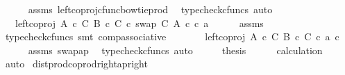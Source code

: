 \begin{isabellebody}
\ \ \ \ \isamarkupfalse%
\ assms\ left{\isacharunderscore}{\kern0pt}coproj{\isacharunderscore}{\kern0pt}cfunc{\isacharunderscore}{\kern0pt}bowtie{\isacharunderscore}{\kern0pt}prod\ \isamarkupfalse%
\ {\isacharparenleft}{\kern0pt}typecheck{\isacharunderscore}{\kern0pt}cfuncs{\isacharcomma}{\kern0pt}\ auto{\isacharparenright}{\kern0pt}\isanewline
\ \ \isamarkupfalse%
\ \isamarkupfalse%
\ {\isachardoublequoteopen}{\isachardot}{\kern0pt}{\isachardot}{\kern0pt}{\isachardot}{\kern0pt}\ {\isacharequal}{\kern0pt}\ left{\isacharunderscore}{\kern0pt}coproj\ {\isacharparenleft}{\kern0pt}A\ {\isasymtimes}\isactrlsub c\ C{\isacharparenright}{\kern0pt}\ {\isacharparenleft}{\kern0pt}B\ {\isasymtimes}\isactrlsub c\ C{\isacharparenright}{\kern0pt}\ {\isasymcirc}\isactrlsub c\ swap\ C\ A\ {\isasymcirc}\isactrlsub c\ {\isasymlangle}c{\isacharcomma}{\kern0pt}\ a{\isasymrangle}{\isachardoublequoteclose}\isanewline
\ \ \ \ \isamarkupfalse%
\ assms\ \isamarkupfalse%
\ {\isacharparenleft}{\kern0pt}typecheck{\isacharunderscore}{\kern0pt}cfuncs{\isacharcomma}{\kern0pt}\ smt\ comp{\isacharunderscore}{\kern0pt}associative{}{\isacharparenright}{\kern0pt}\isanewline
\ \ \isamarkupfalse%
\ \isamarkupfalse%
\ {\isachardoublequoteopen}{\isachardot}{\kern0pt}{\isachardot}{\kern0pt}{\isachardot}{\kern0pt}\ {\isacharequal}{\kern0pt}\ left{\isacharunderscore}{\kern0pt}coproj\ {\isacharparenleft}{\kern0pt}A\ {\isasymtimes}\isactrlsub c\ C{\isacharparenright}{\kern0pt}\ {\isacharparenleft}{\kern0pt}B\ {\isasymtimes}\isactrlsub c\ C{\isacharparenright}{\kern0pt}\ {\isasymcirc}\isactrlsub c\ {\isasymlangle}a{\isacharcomma}{\kern0pt}\ c{\isasymrangle}{\isachardoublequoteclose}\isanewline
\ \ \ \ \isamarkupfalse%
\ assms\ swap{\isacharunderscore}{\kern0pt}ap\ \isamarkupfalse%
\ {\isacharparenleft}{\kern0pt}typecheck{\isacharunderscore}{\kern0pt}cfuncs{\isacharcomma}{\kern0pt}\ auto{\isacharparenright}{\kern0pt}\isanewline
\ \ \isamarkupfalse%
\ \isamarkupfalse%
\ {\isacharquery}{\kern0pt}thesis\isanewline
\ \ \ \ \isamarkupfalse%
\ calculation\ \isamarkupfalse%
\ auto\isanewline
{}\isamarkupfalse%
%
\endisatagproof
{\isafoldproof}%
%
\isadelimproof
\isanewline
%
\endisadelimproof
\isanewline
{}\isamarkupfalse%
\ dist{\isacharunderscore}{\kern0pt}prod{\isacharunderscore}{\kern0pt}coprod{\isacharunderscore}{\kern0pt}right{\isacharunderscore}{\kern0pt}ap{\isacharunderscore}{\kern0pt}right{\isacharcolon}{\kern0pt}\isanewline

\end{isabellebody}
